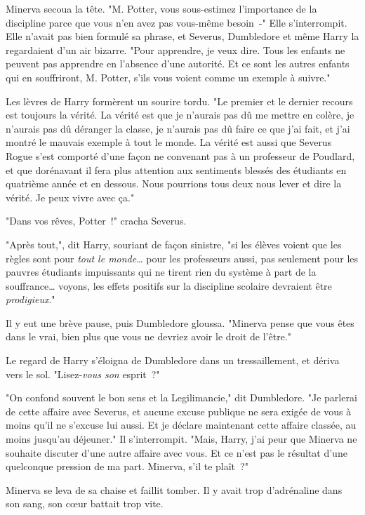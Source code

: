 Minerva secoua la tête. "M. Potter, vous sous-estimez l'importance de la discipline parce que vous n'en avez pas vous-même besoin~-" Elle s'interrompit. Elle n'avait pas bien formulé sa phrase, et Severus, Dumbledore et même Harry la regardaient d'un air bizarre. "Pour apprendre, je veux dire. Tous les enfants ne peuvent pas apprendre en l'absence d'une autorité. Et ce sont les autres enfants qui en souffriront, M. Potter, s'ils vous voient comme un exemple à suivre."

Les lèvres de Harry formèrent un sourire tordu. "Le premier et le dernier recours est toujours la vérité. La vérité est que je n'aurais pas dû me mettre en colère, je n'aurais pas dû déranger la classe, je n'aurais pas dû faire ce que j'ai fait, et j'ai montré le mauvais exemple à tout le monde. La vérité est aussi que Severus Rogue s'est comporté d'une façon ne convenant pas à un professeur de Poudlard, et que dorénavant il fera plus attention aux sentiments blessés des étudiants en quatrième année et en dessous. Nous pourrions tous deux nous lever et dire la vérité. Je peux vivre avec ça."

"Dans vos rêves, Potter~!" cracha Severus.

"Après tout,", dit Harry, souriant de façon sinistre, "si les élèves voient que les règles sont pour \emph{tout le monde}… pour les professeurs aussi, pas seulement pour les pauvres étudiants impuissants qui ne tirent rien du système à part de la souffrance… voyons, les effets positifs sur la discipline scolaire devraient être \emph{prodigieux}."

Il y eut une brève pause, puis Dumbledore gloussa. "Minerva pense que vous êtes dans le vrai, bien plus que vous ne devriez avoir le droit de l'être."

Le regard de Harry s'éloigna de Dumbledore dans un tressaillement, et dériva vers le sol. "Lisez-\emph{vous son} esprit~?"

"On confond souvent le bon sens et la Legilimancie," dit Dumbledore. "Je parlerai de cette affaire avec Severus, et aucune excuse publique ne sera exigée de vous à moins qu'il ne s'excuse lui aussi. Et je déclare maintenant cette affaire classée, au moins jusqu'au déjeuner." Il s'interrompit. "Mais, Harry, j'ai peur que Minerva ne souhaite discuter d'une autre affaire avec vous. Et ce n'est pas le résultat d'une quelconque pression de ma part. Minerva, s'il te plaît~?"

Minerva se leva de sa chaise et faillit tomber. Il y avait trop d'adrénaline dans son sang, son cœur battait trop vite.

